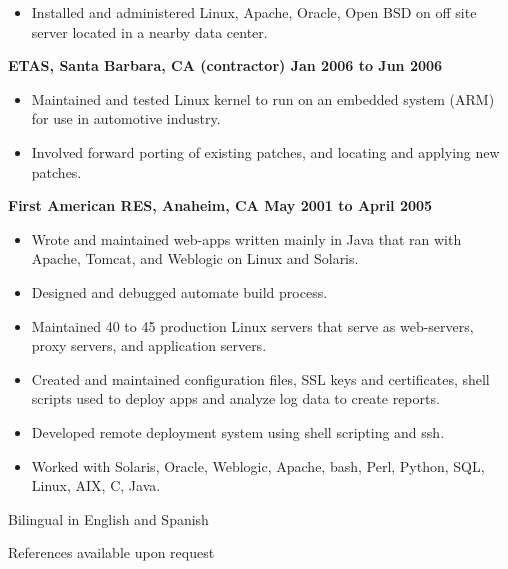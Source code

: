\documentclass{res}
\begin{document}
\begin{resume}
\begin{itemize}
\item
	Installed and administered Linux, Apache, Oracle, Open BSD on
	off site server located in a nearby data center.
\end{itemize}

{\large \bf ETAS, Santa Barbara, CA (contractor) \hfill Jan 2006 to
Jun 2006}

\begin{itemize}

\item
	Maintained and tested Linux kernel to run on an embedded system
	(ARM) for use in automotive industry.

\item
	Involved forward porting of existing patches, and locating and
	applying new patches.

\end{itemize}


{\large \bf First American RES, Anaheim, CA \hfill May 2001 to April 2005}

\begin{itemize}

\item
	Wrote and maintained web-apps written mainly in Java that ran
	with Apache, Tomcat, and Weblogic on Linux and Solaris.
\item
	Designed and debugged automate build process.
\item
	Maintained 40 to 45 production Linux servers that serve as
	web-servers, proxy servers, and application servers.
\item
	Created and maintained configuration files, SSL keys and
	certificates, shell scripts used to deploy apps and analyze log
	data to create reports.

\item
	Developed remote deployment system using shell scripting and ssh.

\item
	Worked with Solaris, Oracle, Weblogic, Apache, bash, Perl,
	Python, SQL, Linux, AIX, C, Java.

\end{itemize}

Bilingual in English and Spanish

References available upon request

\end{resume}
\end{document}
